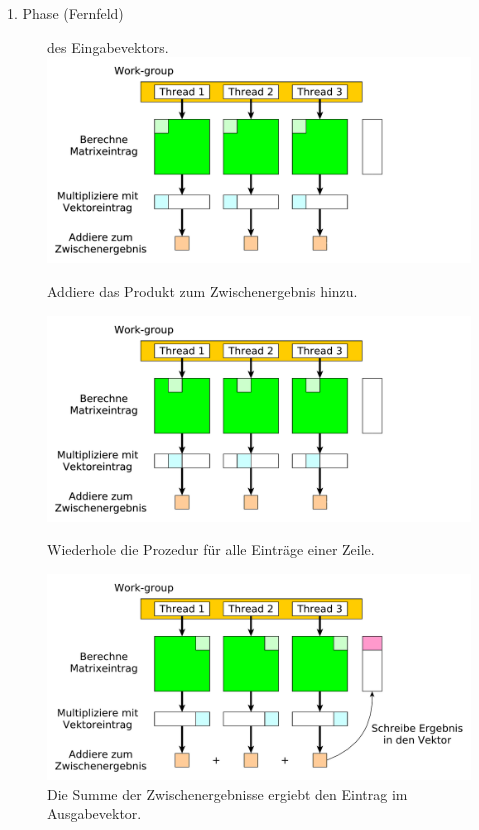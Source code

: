 \documentclass[10pt]{beamer}
\begin{document}
\begin{frame}{1. Phase (Fernfeld)}
\begin{figure}
\begin{overprint}
{                 des Eingabevektors.}
        \centering
        \includegraphics[width=\linewidth]{figures/fg-ff-add-interim-result.pdf}
        \caption{Addiere das Produkt zum Zwischenergebnis hinzu.}
        \centering
        \includegraphics[width=\linewidth]{figures/fg-ff-next-column.pdf}
        \caption{Wiederhole die Prozedur für alle Einträge einer Zeile.}
        \centering
        \includegraphics[width=\linewidth]{figures/fg-ff-write-result.pdf}
        \caption{Die Summe der Zwischenergebnisse ergiebt den Eintrag im
                 Ausgabevektor.}
    \end{overprint}
  \end{figure}
\end{frame}
\end{document}
